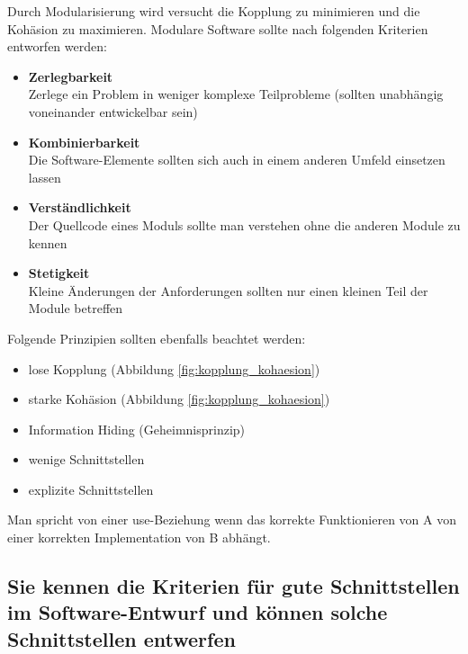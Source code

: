 Durch Modularisierung wird versucht die Kopplung zu minimieren und die Kohäsion zu maximieren. Modulare Software sollte nach folgenden Kriterien entworfen werden:
\begin{itemize}
	\item \textbf{Zerlegbarkeit} \\
		  Zerlege ein Problem in weniger komplexe Teilprobleme (sollten unabhängig voneinander entwickelbar sein)
	\item \textbf{Kombinierbarkeit} \\
		  Die Software-Elemente sollten sich auch in einem anderen Umfeld einsetzen lassen
	\item \textbf{Verständlichkeit} \\
		  Der Quellcode eines Moduls sollte man verstehen ohne die anderen Module zu kennen
	\item \textbf{Stetigkeit} \\
		  Kleine Änderungen der Anforderungen sollten nur einen kleinen Teil der Module betreffen
\end{itemize}
Folgende Prinzipien sollten ebenfalls beachtet werden:
\begin{itemize}
	\item lose Kopplung (Abbildung \ref{fig:kopplung_kohaesion})
	\item starke Kohäsion (Abbildung \ref{fig:kopplung_kohaesion})
	\item Information Hiding (Geheimnisprinzip)
	\item wenige Schnittstellen
	\item explizite Schnittstellen
\end{itemize}
Man spricht von einer use-Beziehung wenn das korrekte Funktionieren von A von einer korrekten Implementation von B abhängt.


\newpage

\subsection{Sie kennen die Kriterien für gute Schnittstellen im Software-Entwurf und können solche Schnittstellen entwerfen}

